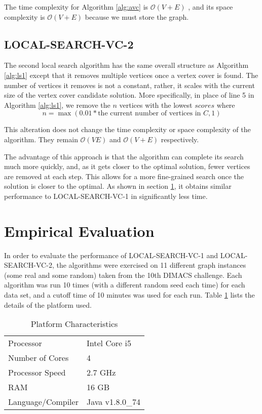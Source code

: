 \documentclass[sigconf]{acmart}
\newcommand{\bigo}[1]{\mathcal{O}(#1)}
\begin{document}
The time complexity for Algorithm \ref{alg:avc} is $\bigo{V + E}$ \cite{intro_alg_2009}, and its space complexity is $\bigo{V + E}$ because we must store the graph.  

\subsection{LOCAL-SEARCH-VC-2}
The second local search algorithm has the same overall structure as Algorithm \ref{alg:ls1} except that it removes multiple vertices once a vertex cover is found. The number of vertices it removes is not a constant, rather, it scales with the current size of the vertex cover candidate solution. More specifically, in place of line 5 in Algorithm \ref{alg:ls1}, we remove the $n$ vertices with the lowest $scores$ where
\begin{equation}
	n = \max(0.01 * \textrm{the current number of vertices in $C$}, 1)
\end{equation}

This alteration does not change the time complexity or space complexity of the algorithm. They remain $\bigo{VE}$ and $\bigo{V + E}$ respectively.

The advantage of this approach is that the algorithm can complete its search much more quickly, and, as it gets closer to the optimal solution, fewer vertices are removed at each step. This allows for a more fine-grained search once the solution is closer to the optimal. As shown in section \ref{sec:eval}, it obtains similar performance to LOCAL-SEARCH-VC-1 in significantly less time.

\section{Empirical Evaluation} \label{sec:eval}
In order to evaluate the performance of LOCAL-SEARCH-VC-1 and LOCAL-SEARCH-VC-2, the algorithms were exercised on 11 different graph instances (some real and some random) taken from the 10th DIMACS challenge. 
Each algorithm was run 10 times (with a different random seed each time) for each data set, and a cutoff time of 10 minutes was used for each run. Table \ref{table:platfm} lists the details of the platform used.
\begin{table}[h]
	\caption{Platform Characteristics}
	\label{table:platfm}
	\begin{tabular}{ll}
		\toprule
		Processor    		&	Intel Core i5 	\\
		Number of Cores		&	4				\\
		Processor Speed 	&	2.7 GHz			\\
		RAM					&	16 GB			\\
		Language/Compiler	&	Java v1.8.0\_74	\\
		\bottomrule
	\end{tabular}
\end{table}
\end{document}

